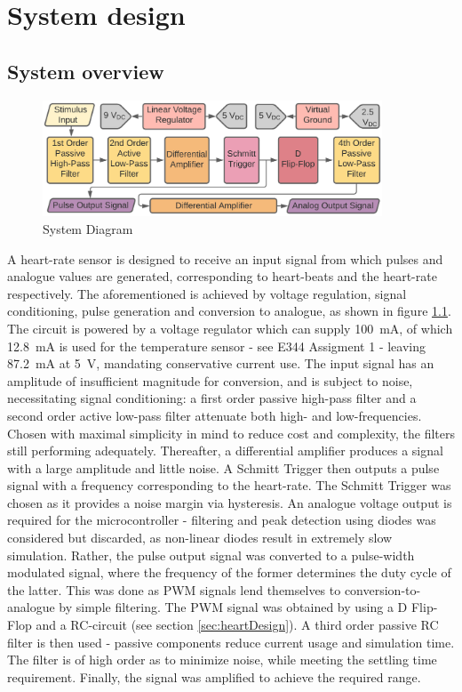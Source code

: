
\chapter{System design}
\section{System overview} \label{sec:system}

\begin{figure}[h]
    \centering
    \vspace{-0.7cm}
    \includegraphics[width = 0.9\textwidth]{Figures/overview}
    \caption{System Diagram}
    \label{fig:overview}
\end{figure}

A heart-rate sensor is designed to receive an input signal from which pulses and analogue values are generated, corresponding to heart-beats and the heart-rate respectively. The aforementioned is achieved by voltage regulation, signal conditioning, pulse generation and conversion to analogue, as shown in figure \ref{fig:overview}. The circuit is powered by a voltage regulator \cite{prev} which can supply \SI{100}{mA}, of which \SI{12.8}{mA} is used for the temperature sensor - see E344 Assigment 1 \cite{prev} - leaving \SI{87.2}{mA} at \SI{5}{V}, mandating conservative current use. The input signal has an amplitude of insufficient magnitude for conversion, and is subject to noise, necessitating signal conditioning: a first order passive high-pass filter and a second order active low-pass filter attenuate both high- and low-frequencies. Chosen with maximal simplicity in mind to reduce cost and complexity, the filters still performing adequately. Thereafter, a differential amplifier produces a signal with a large amplitude and little noise. A Schmitt Trigger then outputs a pulse signal with a frequency corresponding to the heart-rate. The Schmitt Trigger was chosen as it provides a noise margin via hysteresis. An analogue voltage output is required for the microcontroller - filtering and peak detection using diodes was considered but discarded, as non-linear diodes result in extremely slow simulation. Rather, the pulse output signal was converted to a pulse-width modulated signal, where the frequency of the former determines the duty cycle of the latter. This was done as PWM signals lend themselves to conversion-to-analogue by simple filtering. The PWM signal was obtained by using a D Flip-Flop and a RC-circuit (see section \ref{sec:heartDesign}). A third order passive RC filter is then used - passive components reduce current usage and simulation time. The filter is of high order as to minimize noise, while meeting the settling time requirement. Finally, the signal was amplified to achieve the required range.